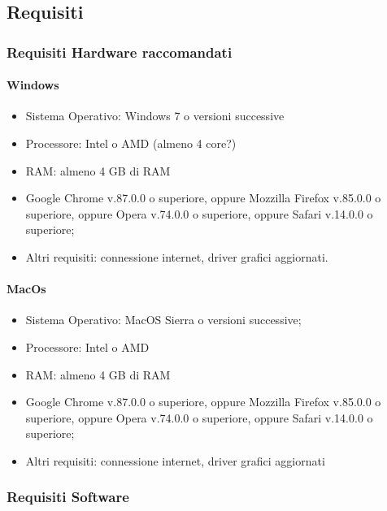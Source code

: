 \documentclass[../manuale_sviluppatore.tex]{subfiles}
\begin{document}
\subsection{Requisiti}
    \label{sec:requisiti}
\subsubsection{Requisiti Hardware raccomandati}
    \label{subsub:req_h}

\paragraph{Windows}
    \label{par:Windows_req}

\begin{itemize}
    \item Sistema Operativo: Windows 7 o versioni successive
    \item Processore: Intel o AMD (almeno 4 core?)
    \item RAM: almeno 4 GB di RAM
    \item Google Chrome v.87.0.0 o superiore, oppure Mozzilla Firefox v.85.0.0 o superiore, oppure Opera v.74.0.0 o superiore, oppure Safari v.14.0.0 o superiore;
    \item Altri requisiti: connessione internet, driver grafici aggiornati.
\end{itemize}

\paragraph{MacOs}
    \label{par:mac_req}

\begin{itemize}
    \item Sistema Operativo: MacOS Sierra o versioni successive;
    \item Processore: Intel o AMD
    \item RAM: almeno 4 GB di RAM
    \item Google Chrome v.87.0.0 o superiore, oppure Mozzilla Firefox v.85.0.0 o superiore, oppure Opera v.74.0.0 o superiore, oppure Safari v.14.0.0 o superiore;
    \item Altri requisiti: connessione internet, driver grafici aggiornati
\end{itemize}

\subsubsection{Requisiti Software}
    \label{subsub:req_s}
\end{document}
